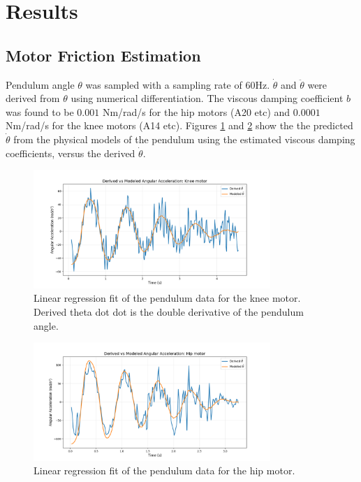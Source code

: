 \section{Results}

\subsection{Motor Friction Estimation}
Pendulum angle \(\theta\) was sampled with a sampling rate of 60Hz. \(\dot{\theta}\) and \(\ddot{\theta}\) were derived from \(\theta\) using numerical differentiation. The viscous damping coefficient \( b \) was found to be \( 0.001 \) Nm/rad/s for the hip motors (A20 etc) and \( 0.0001 \) Nm/rad/s for the knee motors (A14 etc). Figures \ref{fig:results:motor_friction_estimation:linear_regression_knee_motor} and \ref{fig:results:motor_friction_estimation:linear_regression_hip_motor} show the the predicted \(\dot{\theta}\) from the physical models of the pendulum using the estimated viscous damping coefficients, versus the derived \(\dot{\theta}\).

\begin{figure}[h]
    \centering
    \includegraphics[width=0.8\textwidth]{Images/results/friction_est_knee_motor.png}
    \caption{Linear regression fit of the pendulum data for the knee motor. Derived theta dot dot is the double derivative of the pendulum angle.}
    \label{fig:results:motor_friction_estimation:linear_regression_knee_motor}
\end{figure}

\begin{figure}[h]
    \centering
    \includegraphics[width=0.8\textwidth]{Images/results/friction_est_hip_motor.png}
    \caption{Linear regression fit of the pendulum data for the hip motor.}
    \label{fig:results:motor_friction_estimation:linear_regression_hip_motor}
\end{figure}




